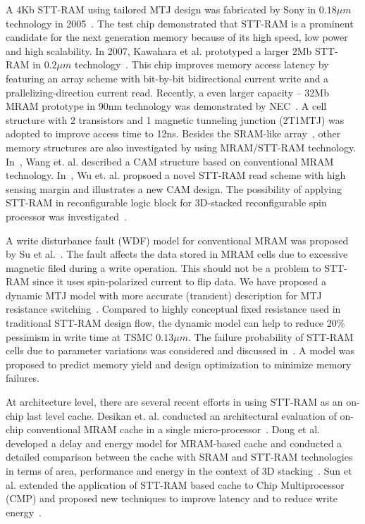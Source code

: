 A 4Kb STT-RAM using tailored MTJ design was fabricated by Sony in $0.18{\mu}m$ technology in 2005~\cite{Hosomi05}. The test chip demonstrated that STT-RAM is a prominent candidate for the next generation memory because of its high speed, low power and high scalability. In 2007, Kawahara et al. prototyped a larger 2Mb STT-RAM in $0.2{\mu}m$ technology~\cite{Kawahara07}. This chip improves memory access latency by featuring an array scheme with bit-by-bit bidirectional current write and a prallelizing-direction current read. Recently, a even larger capacity -- 32Mb MRAM prototype in 90nm technology was demonstrated by NEC~\cite{Nebashi09}. A cell structure with 2 transistors and 1 magnetic tunneling junction (2T1MTJ) was adopted to improve access time to 12ns. Besides the SRAM-like array~\cite{Motoyoshi04,Andre05,Kawahara08}, other memory structures are also investigated by using MRAM/STT-RAM technology. In~\cite{Wang07}, Wang et. al. described a CAM structure based on conventional MRAM technology. In~\cite{Xu08}, Wu et. al. propsoed a novel STT-RAM read scheme with high sensing margin and illustrates a new CAM design. The possibility of applying STT-RAM in reconfigurable logic block for 3D-stacked reconfigurable spin processor was investigated~\cite{Sekikawa08}.

A write disturbance fault (WDF) model for conventional MRAM was proposed by Su et al.~\cite{Su08}. The fault affects the data stored in MRAM cells due to excessive magnetic filed during a write operation.
This should not be a problem to STT-RAM since it uses spin-polarized current to flip data. We have proposed a dynamic MTJ model with more accurate (transient) description for MTJ resistance switching~\cite{Chen08}. Compared to highly conceptual fixed resistance used in traditional STT-RAM design flow, the dynamic model can help to reduce 20\% pessimism in write time at TSMC $0.13{\mu}m$. The failure probability of STT-RAM cells due to parameter variations was considered and discussed in~\cite{Li09}. A model was proposed to predict memory yield and design optimization to minimize memory failures.

At architecture level, there are several recent efforts in using STT-RAM as an on-chip last level cache. Desikan et. al. conducted an architectural evaluation of on-chip conventional MRAM cache in a single micro-processor~\cite{Desikan02}. Dong et al. developed a delay and energy model for MRAM-based cache and conducted a detailed comparison between the cache with SRAM and STT-RAM technologies in terms of area, performance and energy in the context of 3D stacking~\cite{MRAM:DONG08}. Sun et al. extended the application of STT-RAM based cache to Chip Multiprocessor (CMP) and proposed new techniques to improve latency and to reduce write energy~\cite{Sun09}.

